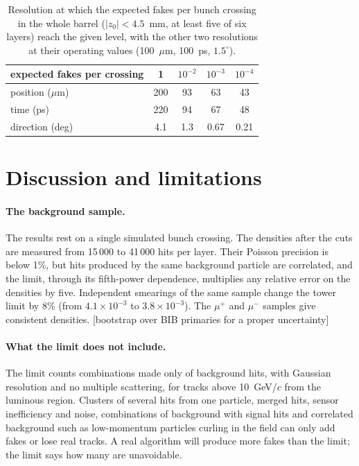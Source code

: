 \IfFileExists{jinst.cls}{\documentclass[a4paper,11pt]{jinst}}
\newcommand{\todo}[1]{\textcolor{red!70!black}{[#1]}}
\begin{document}
\begin{table}[htbp]
  \centering
  \caption{Resolution at which the expected fakes per bunch crossing in the whole barrel
  ($|z_0|<4.5$~mm, at least five of six layers) reach the given level, with the other two
  resolutions at their operating values (100~$\mu$m, 100~ps, $1.5^\circ$).}
  \label{tab:targets}
  \begin{tabular}{lcccc}
    \toprule
    expected fakes per crossing & 1 & $10^{-2}$ & $10^{-3}$ & $10^{-4}$ \\
    \midrule
    position ($\mu$m) & 200 & 93 & 63 & 43 \\
    time (ps)         & 220 & 94 & 67 & 48 \\
    direction (deg)   & 4.1 & 1.3 & 0.67 & 0.21 \\
    \bottomrule
  \end{tabular}
\end{table}

\section{Discussion and limitations}\label{sec:discussion}

\paragraph{The background sample.} The results rest on a single simulated bunch crossing. The
densities after the cuts are measured from 15\,000 to 41\,000 hits per layer. Their Poisson
precision is below 1\%, but hits produced by the same background particle are correlated, and the
limit, through its fifth-power dependence, multiplies any relative error on the densities by five.
Independent smearings of the same sample change the tower limit by 8\% (from $4.1\times10^{-3}$ to
$3.8\times10^{-3}$). The $\mu^+$ and $\mu^-$
samples give consistent densities. \todo{bootstrap over BIB primaries for a proper uncertainty}

\paragraph{What the limit does not include.} The limit counts combinations made only of background
hits, with Gaussian resolution and no multiple scattering, for tracks above 10~GeV/$c$ from the
luminous region. Clusters of several hits from one particle, merged hits, sensor inefficiency and
noise, combinations of background with signal hits and correlated background such as low-momentum
particles curling in the field can only add fakes or lose real tracks. A real algorithm will
produce more fakes than the limit; the limit says how many are unavoidable.
\end{document}
